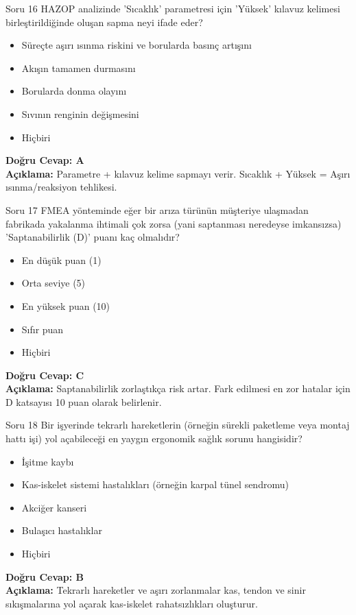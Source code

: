 \documentclass[12pt,a4paper]{article}
\begin{document}
\begin{testcard}{Soru 16}
    HAZOP analizinde 'Sıcaklık' parametresi için 'Yüksek' kılavuz kelimesi birleştirildiğinde oluşan sapma neyi ifade eder?
    \begin{itemize}
        \item[A)] Süreçte aşırı ısınma riskini ve borularda basınç artışını
        \item[B)] Akışın tamamen durmasını
        \item[C)] Borularda donma olayını
        \item[D)] Sıvının renginin değişmesini
        \item[E)] Hiçbiri
    \end{itemize}
    \tcblower
    \textbf{Doğru Cevap: A} \\
    \textbf{Açıklama:} Parametre + kılavuz kelime sapmayı verir. Sıcaklık + Yüksek = Aşırı ısınma/reaksiyon tehlikesi.
\end{testcard}

\begin{testcard}{Soru 17}
    FMEA yönteminde eğer bir arıza türünün müşteriye ulaşmadan fabrikada yakalanma ihtimali çok zorsa (yani saptanması neredeyse imkansızsa) 'Saptanabilirlik (D)' puanı kaç olmalıdır?
    \begin{itemize}
        \item[A)] En düşük puan (1)
        \item[B)] Orta seviye (5)
        \item[C)] En yüksek puan (10)
        \item[D)] Sıfır puan
        \item[E)] Hiçbiri
    \end{itemize}
    \tcblower
    \textbf{Doğru Cevap: C} \\
    \textbf{Açıklama:} Saptanabilirlik zorlaştıkça risk artar. Fark edilmesi en zor hatalar için D katsayısı 10 puan olarak belirlenir.
\end{testcard}

\begin{testcard}{Soru 18}
    Bir işyerinde tekrarlı hareketlerin (örneğin sürekli paketleme veya montaj hattı işi) yol açabileceği en yaygın ergonomik sağlık sorunu hangisidir?
    \begin{itemize}
        \item[A)] İşitme kaybı
        \item[B)] Kas-iskelet sistemi hastalıkları (örneğin karpal tünel sendromu)
        \item[C)] Akciğer kanseri
        \item[D)] Bulaşıcı hastalıklar
        \item[E)] Hiçbiri
    \end{itemize}
    \tcblower
    \textbf{Doğru Cevap: B} \\
    \textbf{Açıklama:} Tekrarlı hareketler ve aşırı zorlanmalar kas, tendon ve sinir sıkışmalarına yol açarak kas-iskelet rahatsızlıkları oluşturur.
\end{testcard}
\end{document}
